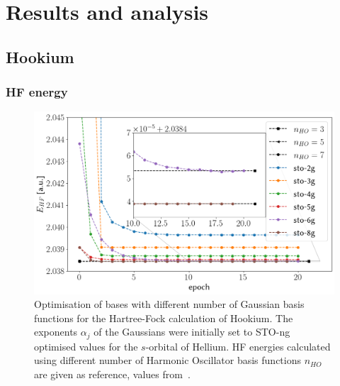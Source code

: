 \documentclass[final,3p,times,twocolumn]{elsarticle}
\begin{document}
	\section{Results and analysis}
	\label{sec:results}
	
	\subsection{Hookium}
	\subsubsection{HF energy}
	
	\begin{figure}[h]
		\centering
		\includegraphics[width=\linewidth]{../plots/HF_optimization}
		\caption{Optimisation of bases with different number of Gaussian basis functions for the Hartree-Fock calculation of Hookium. The exponents $\alpha_{j}$ of the Gaussians were initially set to STO-ng optimised values for the $s$-orbital of Hellium. HF energies calculated using different number of Harmonic Oscillator basis functions $n_{HO}$ are given as reference, values from~\cite{ONeill2003wave}.}
		\label{fig:hfoptimization}
	\end{figure}
	
\end{document}
